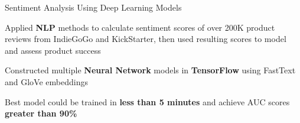 \begin{cventries}
  \cvprojects
    {} %
    {Sentiment Analysis Using Deep Learning Models} %
    {} %
    {} %
    {
      \begin{cvitems} %
        \item {Applied \textbf{NLP} methods to calculate sentiment scores of over 200K product reviews from
        IndieGoGo and KickStarter, then used resulting scores to model and assess product success}
        \item {Constructed multiple \textbf{Neural Network} models in \textbf{TensorFlow} using FastText and GloVe embeddings}
        \item{Best model could be trained in \textbf{less than 5 minutes} and
        achieve AUC scores \textbf{greater than 90\%}}
      \end{cvitems}
    }




    
        
\end{cventries}
